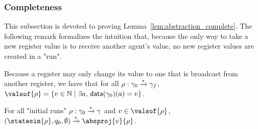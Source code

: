 \subsubsection{Completeness}
\label{one-completeness}

This subsection is devoted to proving Lemma~\ref{lem:abstraction_complete}.
The following remark formalizes the intuition that, because the only way to take a new register value is to receive another agent's value, no new register values are created in a "run".
\begin{remark}
	\label{rem:run_no_new_register_values}
	Because a register may only change its value to one that is broadcast from another register, we have that for all $\rho: \gamma_0 \xrightarrow{*} \gamma_f$, $\valsof{\run} = \set{\aval \in \nats \mid \exists a, \, \data{\config_0}(a) = \aval}$.
\end{remark}




\begin{lemma}
	\label{lem:proof_completeness_covset_constant}
	For all "initial runs" $\rho: \gamma_0 \xrightarrow{*} \gamma$ and $\aval \in \valsof{\run}$, $(\statesin{\run}, q_0, \emptyset) \step{*} \absproj{\aval}{\run}$. 
\end{lemma}

